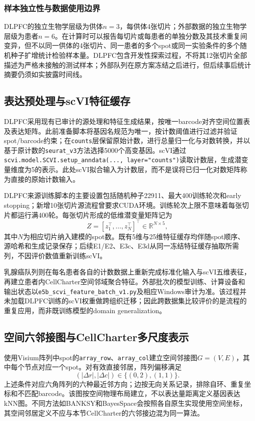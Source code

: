 \subsubsection{样本独立性与数据使用边界}
DLPFC的独立生物学层级为供体$n=3$，每供体4张切片；外部数据的独立生物学层级为患者$n=6$。在计算时可以报告每切片或每患者的单独分数及其技术重复间变异，但不以同一供体的4张切片、同一患者的多个spot或同一实验条件的多个随机种子扩增统计检验样本量。DLPFC包含开发性探索过程，不将其12张切片全部描述为严格未接触的测试样本；外部队列在原方案冻结之后进行，但后续事后统计摘要仍须如实披露时间线。

\subsection{表达预处理与scVI特征缓存}
\label{subsec:cc-preprocess-v1}
DLPFC采用现有已审计的源处理和特征生成结果，按唯一barcode对齐空间位置表及表达矩阵。此前准备脚本将基因名规范为唯一，按计数阈值进行过滤并验证spot/barcode约束；在\texttt{counts}层保留原始计数，进行总量归一化与对数转换，并以基于原计数的\texttt{seurat\_v3}方法选择5000个高变基因。scVI通过\texttt{scvi.model.SCVI.setup\_anndata(..., layer="counts")}读取计数层，生成潜变量维度为5的表示。此处scVI拟合输入为计数层，而不是误将已归一化对数矩阵称为直接的原始计数输入。

DLPFC来源训练脚本的主要设置包括随机种子22911、最大400训练轮次和early stopping；新增10张切片源流程曾要求CUDA环境。训练轮次上限不意味着每张切片都运行满400轮。每张切片形成的低维潜变量矩阵记为
\begin{equation}
Z=[z_1^\top,\ldots,z_N^\top]^\top\in\mathbb{R}^{N\times5},
\end{equation}
其中$N$为相应切片纳入建模的spot数。既有5维与25维特征缓存均伴随spot顺序、源哈希和生成记录保存；后续E1/E2、E3c、E3d从同一冻结特征缓存抽取所需列，不因评价数值重新训练scVI。

乳腺癌队列则在每名患者各自的计数数据上重新完成标准化输入与scVI五维表征，再建立患者内CellCharter空间邻域聚合特征。外部批次的模型训练、计算设备和输出状态以\texttt{e5b\_scvi\_feature\_batch\_v1.py}及相应Windows审计为准。该过程并未加载DLPFC训练的scVI权重做跨组织迁移；因此跨数据集比较评价的是流程的重复应用，而非既训练模型的domain generalization。

\subsection{空间六邻接图与CellCharter多尺度表示}
\label{subsec:cc-spatial-v1}

使用Visium阵列中spot的\texttt{array\_row}、\texttt{array\_col}建立空间邻接图$G=(V,E)$，其中每个节点对应一个spot。对有效直接邻居，阵列偏移满足
\begin{equation}
(|\Delta r|,|\Delta c|)\in\{(0,2),(1,1)\}.
\label{eq:cc-hex-v1}
\end{equation}
上述条件对应六角阵列的六种最近邻方向；边按无向关系记录，排除自环、重复坐标和不匹配barcode。该图按空间物理布局建立，不以表达量距离定义基因表达kNN图。不同方法如BANKSY和BayesSpace会按照各自原生实现使用空间坐标，其空间邻居定义不应与本节CellCharter的六邻接边混为同一算法。

